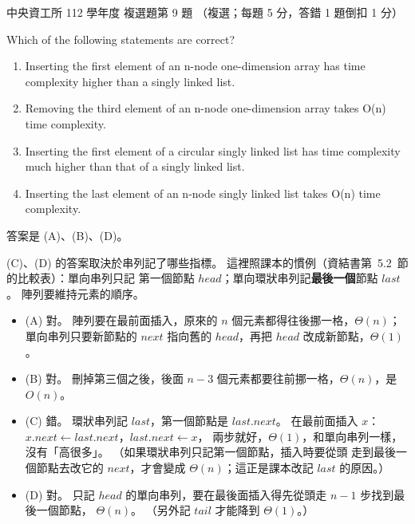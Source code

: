 \begin{pastexam}[label={px:ncu-112-dsa-09}]{中央資工所 112 學年度 複選題第 9 題}
（複選；每題 5 分，答錯 1 題倒扣 1 分）

Which of the following statements are correct?
\begin{enumerate}[label=(\Alph*)]
\item Inserting the first element of an n-node one-dimension array has time complexity higher than a
singly linked list.
\item Removing the third element of an n-node one-dimension array takes O(n) time complexity.
\item Inserting the first element of a circular singly linked list has time complexity much higher than
that of a singly linked list.
\item Inserting the last element of an n-node singly linked list takes O(n) time complexity.
\end{enumerate}
\end{pastexam}

\begin{pastsoln}
答案是 (A)、(B)、(D)。

(C)、(D) 的答案取決於串列記了哪些指標。 這裡照課本的慣例（資結書第~5.2~節的比較表）：單向串列只記
第一個節點 $\mathit{head}$；單向環狀串列記\textbf{最後一個}節點 $\mathit{last}$。 陣列要維持元素的順序。
\begin{itemize}
\item (A) 對。 陣列要在最前面插入，原來的 $n$ 個元素都得往後挪一格，$\Theta(n)$；單向串列只要新節點的
$\mathit{next}$ 指向舊的 $\mathit{head}$，再把 $\mathit{head}$ 改成新節點，$\Theta(1)$。
\item (B) 對。 刪掉第三個之後，後面 $n - 3$ 個元素都要往前挪一格，$\Theta(n)$，是 $O(n)$。
\item (C) 錯。 環狀串列記 $\mathit{last}$，第一個節點是 $\mathit{last}.\mathit{next}$。 在最前面插入
$x$：$x.\mathit{next} \gets \mathit{last}.\mathit{next}$，$\mathit{last}.\mathit{next} \gets x$，
兩步就好，$\Theta(1)$，和單向串列一樣，沒有「高很多」。 （如果環狀串列只記第一個節點，插入時要從頭
走到最後一個節點去改它的 $\mathit{next}$，才會變成 $\Theta(n)$；這正是課本改記 $\mathit{last}$ 的原因。）
\item (D) 對。 只記 $\mathit{head}$ 的單向串列，要在最後面插入得先從頭走 $n - 1$ 步找到最後一個節點，
$\Theta(n)$。 （另外記 $\mathit{tail}$ 才能降到 $\Theta(1)$。）
\end{itemize}
\end{pastsoln}
